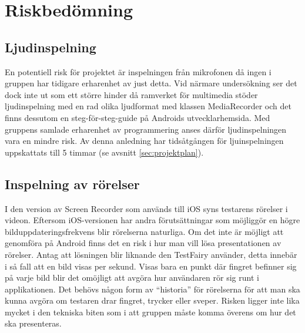 \section{Riskbedömning}
\subsection{Ljudinspelning}
En potentiell risk för projektet är inspelningen från mikrofonen då ingen i gruppen har tidigare erharenhet av just detta. Vid närmare undersökning ser det dock inte ut som ett större hinder då ramverket för multimedia stöder ljudinspelning med en rad olika ljudformat med klassen MediaRecorder \parencite{sound} och det finns dessutom en steg-för-steg-guide på Androids utvecklarhemsida. Med gruppens samlade erharenhet av programmering anses därför ljudinspelningen vara en mindre risk. Av denna anledning har tidsåtgången för ljuinspelningen uppskattats till 5 timmar (se avsnitt \ref{sec:projektplan}).

\subsection{Inspelning av rörelser}
I den version av Screen Recorder som används till iOS syns testarens rörelser i videon. Eftersom iOS-versionen har andra förutsättningar som möjliggör en högre bilduppdateringsfrekvens blir rörelserna naturliga. Om det inte är möjligt att genomföra på Android finns det en risk i hur man vill lösa presentationen av rörelser. Antag att lösningen blir liknande den TestFairy använder, detta innebär i så fall att en bild visas per sekund. Visas bara en punkt där fingret befinner sig på varje bild blir det omöjligt att avgöra hur användaren rör sig runt i applikationen. Det behövs någon form av ``historia'' för rörelserna för att man ska kunna avgöra om testaren drar fingret, trycker eller sveper. Risken ligger inte lika mycket i den tekniska biten som i att gruppen måste komma överens om hur det ska presenteras.
